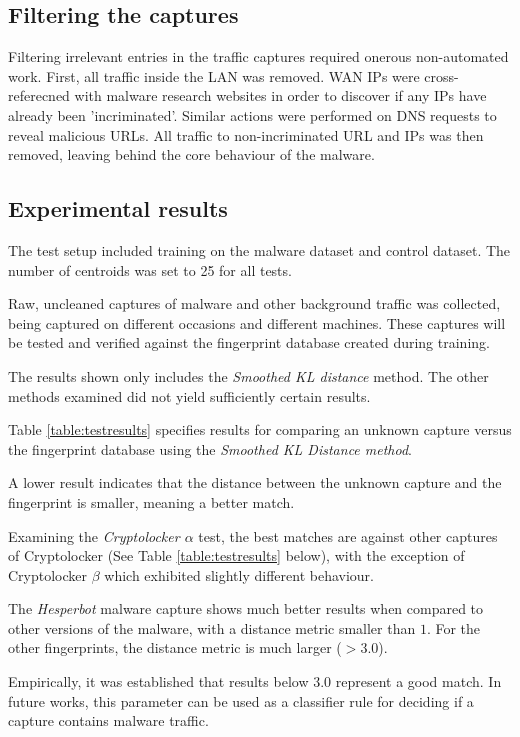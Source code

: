 \documentclass[13pt,journal,compsoc,onecolumn]{IEEEtran}
\begin{document}
\subsection{Filtering the captures}
Filtering irrelevant entries in the traffic captures required onerous non-automated work.
First, all traffic inside the LAN was removed. WAN IPs were cross-referecned with malware research websites in order to discover if any IPs have already been 'incriminated'.
Similar actions were performed on DNS requests to reveal malicious URLs.
All traffic to non-incriminated URL and IPs was then removed, leaving behind the core behaviour of the malware.

\subsection{Experimental results}
The test setup included training on the malware dataset and control dataset.
The number of centroids was set to 25 for all tests.

Raw, uncleaned captures of malware and other background traffic was collected, being captured on different occasions and different machines. These captures will be tested and verified against the fingerprint database created during training.

The results shown only includes the {\em Smoothed KL distance} method. The other methods examined did not yield sufficiently certain results.

Table \ref{table:testresults} specifies results for comparing an unknown capture versus the fingerprint database using the {\em Smoothed KL Distance method}.

A lower result indicates that the distance between the unknown capture and the fingerprint is smaller, meaning a better match.

Examining the \emph{Cryptolocker $\alpha$} test, the best matches are against other captures of Cryptolocker (See Table \ref{table:testresults} below), with the exception of Cryptolocker $\beta$ which exhibited slightly different behaviour.

The \emph{Hesperbot} malware capture shows much better results when compared to other versions of the malware, with a distance metric smaller than $1$.
For the other fingerprints, the distance metric is much larger ($>3.0$).

Empirically, it was established that results below $3.0$ represent a good match. In future works, this parameter can be used as a classifier rule for deciding if a capture contains malware traffic.
\end{document}
